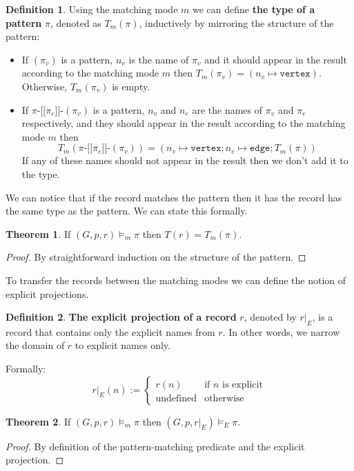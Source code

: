 \documentclass[14pt]{constructor-thesis}
\theoremstyle{definition}
\newtheorem{theorem}{Theorem}
\newtheorem{definition}{Definition}
\newcommand{\patternstart}[1]{(#1)}
\newcommand{\patternhop}[3]{#1 \texttt{-[[} #2 \texttt{]]-} (#3)}
\begin{document}
\begin{definition}
  Using the matching mode $m$ we can define \textbf{the type of a pattern} $\pi$, denoted as $T_m(\pi)$, inductively by mirroring the structure of the pattern:
  \begin{itemize}
    \item If $\patternstart{\pi_v}$ is a pattern, $n_v$ is the name of $\pi_v$ and it should appear in the result according to the matching mode $m$ then $T_m \patternstart{\pi_v} = (n_v \mapsto \texttt{vertex})$. Otherwise, $T_m \patternstart{\pi_v}$ is empty.
    \item If $\patternhop{\pi}{\pi_e}{\pi_v}$ is a pattern, $n_v$ and $n_e$ are the names of $\pi_v$ and $\pi_e$ respectively, and they should appear in the result according to the matching mode $m$ then
    $$T_m(\patternhop{\pi}{\pi_e}{\pi_v}) = (n_v \mapsto \texttt{vertex}; n_e \mapsto \texttt{edge}; T_m(\pi))$$ 
    If any of these names should not appear in the result then we don't add it to the type.
  \end{itemize}
\end{definition}

We can notice that if the record matches the pattern then it has the record has the same type as the pattern. We can state this formally.
\begin{theorem}
  \label{thm:matching-mode-type}
  If $(G, p, r) \models_m \pi$ then $T(r) = T_m(\pi)$.
\end{theorem}
\begin{proof}
  By straightforward induction on the structure of the pattern.
\end{proof}

To transfer the records between the matching modes we can define the notion of explicit projections.

\begin{definition}
  \textbf{The explicit projection of a record} $r$, denoted by $r |_E$, is a record that contains only the explicit names from $r$. In other words, we narrow the domain of $r$ to explicit names only.

  Formally:
  $$ r|_E(n) :=
    \begin{cases}
      r(n) & \text{if $n$ is explicit} \\
      \text{undefined} & \text{otherwise}
    \end{cases} $$
\end{definition}

\begin{theorem}
  \label{thm:matching-mode-narrow}
  If $(G, p, r)\models_m \pi$ then $(G, p, r |_E) \models_E \pi$.
\end{theorem}
\begin{proof}
  By definition of the pattern-matching predicate and the explicit projection.
\end{proof}
\end{document}
